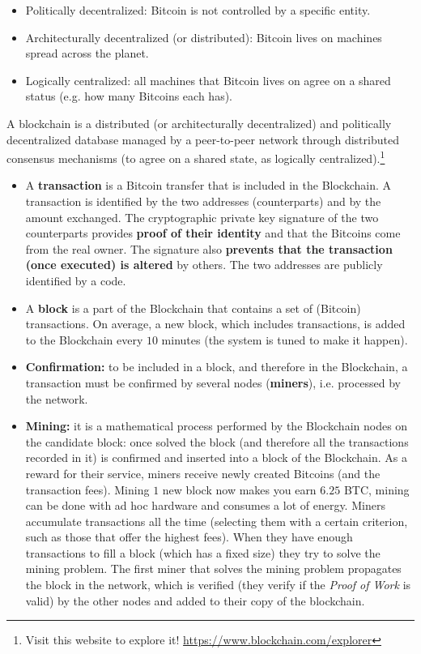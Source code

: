 \begin{itemize}
    \item Politically decentralized: Bitcoin is not controlled by a specific entity.
    \item Architecturally decentralized (or distributed): Bitcoin lives on machines spread across the planet.
    \item Logically centralized: all machines that Bitcoin lives on agree on a shared status (e.g. how many Bitcoins each has).
\end{itemize}

A blockchain is a distributed (or architecturally decentralized) and politically decentralized database managed by a peer-to-peer network through distributed consensus mechanisms (to agree on a shared state, as logically centralized).\footnote{Visit this website to explore it! \url{https://www.blockchain.com/explorer}}
\begin{itemize}
    \item A \textbf{transaction} is a Bitcoin transfer that is included in the Blockchain. A transaction is identified by the two addresses (counterparts) and by the amount exchanged. The cryptographic private key signature of the two counterparts provides \textbf{proof of their identity} and that the Bitcoins come from the real owner. The signature also \textbf{prevents that the transaction (once executed) is altered} by others. The two addresses are publicly identified by a code.
\end{itemize}


\begin{itemize}
    \item A \textbf{block} is a part of the Blockchain that contains a set of (Bitcoin) transactions. On average, a new block, which includes transactions, is added to the Blockchain every $10$ minutes (the system is tuned to make it happen).
    \item \textbf{Confirmation:} to be included in a block, and therefore in the Blockchain, a transaction must be confirmed by several nodes (\textbf{miners}), i.e. processed by the network.
    \item \textbf{Mining:} it is a mathematical process performed by the Blockchain nodes on the candidate block: once solved the block (and therefore all the transactions recorded in it) is confirmed and inserted into a block of the Blockchain. As a reward for their service, miners receive newly created Bitcoins (and the transaction fees). Mining $1$ new block now makes you earn $6.25$ BTC, mining can be done with ad hoc hardware and consumes a lot of energy.
    Miners accumulate transactions all the time (selecting them with a certain criterion, such as those that offer the highest fees). When they have enough transactions to fill a block (which has a fixed size) they try to solve the mining problem. The first miner that solves the mining problem propagates the block in the network, which is verified (they verify if the \textit{Proof of Work} is valid) by the other nodes and added to their copy of the blockchain.
\end{itemize}

